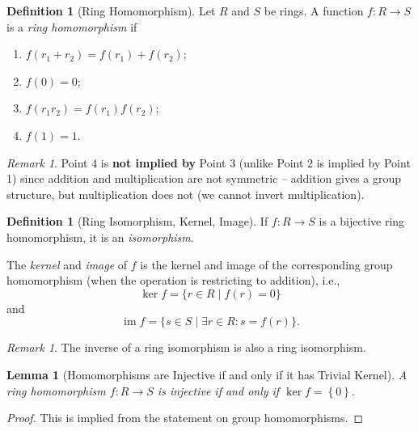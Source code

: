 \documentclass{article}
\newtheorem{lemma}[theorem]{Lemma}
\theoremstyle{definition}
\newtheorem{definition}[theorem]{Definition}
\theoremstyle{remark}
\newtheorem{remark}[theorem]{Remark}
\newcommand{\pqty}[1]{\left(#1\right)}
\newcommand{\Bqty}[1]{\left\{#1\right\}}
\newcommand{\set}[2]{\{#1\mid #2\}}
\newcommand{\functiondomain}[3]{#1:#2\to #3}
\newcommand{\img}{\operatorname{im}}
\begin{document}
\begin{definition}[Ring Homomorphism]
    \label{def:ring-homomorphism}%
    Let \(R\) and \(S\) be rings. A function \(\functiondomain{f}{R}{S}\) is a \emph{ring homomorphism} if
    \begin{enumerate}
        \item \(f\pqty{r_1 + r_2} = f\pqty{r_1} + f\pqty{r_2}\);
        \item \(f\pqty{0} = 0\);
        \item \(f\pqty{r_1 r_2} = f\pqty{r_1} f\pqty{r_2}\);
        \item \(f\pqty{1} = 1\).
    \end{enumerate}
\end{definition}

\begin{remark}
    Point 4 is \textbf{not implied by} Point 3 (unlike Point 2 is implied by Point 1) since addition and multiplication are not symmetric -- addition gives a group structure, but multiplication does not (we cannot invert multiplication).
\end{remark}

\begin{definition}[Ring Isomorphism, Kernel, Image]
    \label{def:ring-isomorphism-kernel-image}%
    If \(\functiondomain{f}{R}{S}\) is a bijective ring homomorphism, it is an \emph{isomorphism}.

    The \emph{kernel} and \emph{image} of \(f\) is the kernel and image of the corresponding group homomorphism (when the operation is restricting to addition), i.e.,
    \[
        \ker f = \set{r \in R}{f \pqty{r} = 0}
    \]
    and
    \[
        \img f = \set{s \in S}{\exists r \in R: s = f\pqty{r}}.
    \]
\end{definition}

\begin{remark}
    The inverse of a ring isomorphism is also a ring isomorphism.
\end{remark}

\begin{lemma}[Homomorphisms are Injective if and only if it has Trivial Kernel]
    \label{lem:homomorphisms-injective-trivial-kernel}%
    A ring homomorphism \(\functiondomain{f}{R}{S}\) is injective if and only if \(\ker f = \Bqty{0}\).
\end{lemma}

\begin{proof}
    This is implied from the statement on group homomorphisms.
\end{proof}
\end{document}
